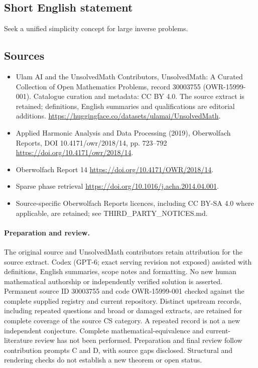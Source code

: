 \documentclass[11pt]{article}
\begin{document}
\subsection{Short English statement}
Seek a unified simplicity concept for large inverse problems.
\subsection{Sources}
\begin{itemize}
\item[\hypertarget{source:30003755:1}{S1}] Ulam AI and the UnsolvedMath Contributors, UnsolvedMath: A Curated Collection of Open Mathematics Problems, record 30003755 (OWR-15999-001). Catalogue curation and metadata: CC BY 4.0. The source extract is retained; definitions, English summaries and qualifications are editorial additions.
\url{https://huggingface.co/datasets/ulamai/UnsolvedMath}.
\item[\hypertarget{source:30003755:2}{S2}] Applied Harmonic Analysis and Data Processing (2019), Oberwolfach Reports, DOI 10.4171/owr/2018/14, pp. 723--792
\url{https://doi.org/10.4171/owr/2018/14}.
\item[\hypertarget{source:30003755:3}{S3}] Oberwolfach Report 14
\url{https://doi.org/10.4171/OWR/2018/14}.
\item[\hypertarget{source:30003755:4}{S4}] Sparse phase retrieval
\url{https://doi.org/10.1016/j.acha.2014.04.001}.
\item Source-specific Oberwolfach Reports licences, including CC BY-SA 4.0 where applicable, are retained; see THIRD\_PARTY\_NOTICES.md.
\end{itemize}
\paragraph{Preparation and review.}
The original source and UnsolvedMath contributors retain attribution for the source extract. Codex (GPT-6; exact serving revision not exposed) assisted with definitions, English summaries, scope notes and formatting. No new human mathematical authorship or independently verified solution is asserted. Permanent source ID 30003755 and code OWR-15999-001 checked against the complete supplied registry and current repository. Distinct upstream records, including repeated questions and broad or damaged extracts, are retained for complete coverage of the source CS category. A repeated record is not a new independent conjecture. Complete mathematical-equivalence and current-literature review has not been performed. Preparation and final review follow contribution prompts C and D, with source gaps disclosed. Structural and rendering checks do not establish a new theorem or open status.
\label{end:30003755}
\end{document}

